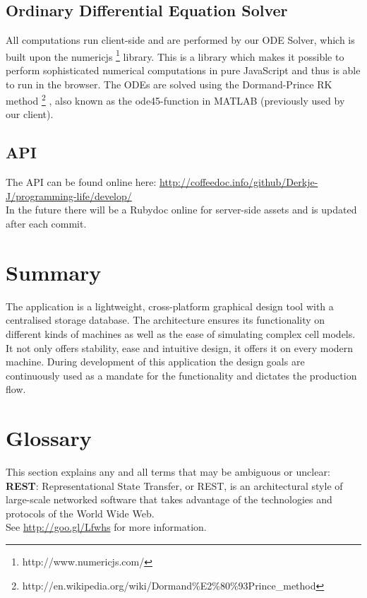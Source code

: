 \documentclass{report}
\begin{document}
		\subsection{Ordinary Differential Equation Solver}
			All computations run client-side and are performed by our ODE Solver, which is built upon the numericjs \footnote{http://www.numericjs.com/} library. This is a library which makes it possible to perform sophisticated numerical computations in pure JavaScript and thus is able to run in the browser. The ODEs are solved using the Dormand-Prince RK method \footnote{http://en.wikipedia.org/wiki/Dormand\%E2\%80\%93Prince\_method} , also known as the ode45-function in MATLAB (previously used by our client).
			
		\subsection{API}
			The API can be found online here: \url{http://coffeedoc.info/github/Derkje-J/programming-life/develop/} \\
			In the future there will be a Rubydoc online for server-side assets and is updated after each commit.
		\newpage
			
	\section{Summary}
		The application is a lightweight, cross-platform graphical design tool with a centralised storage database. The architecture ensures its functionality on different kinds of machines as well as the ease of simulating complex cell models. It not only offers stability, ease and intuitive design, it offers it on every modern machine. During development of this application the design goals are continuously used as a mandate for the functionality and dictates the production flow.
	\section{Glossary}
		This section explains any and all terms that may be ambiguous or unclear:\\
		
		\textbf{REST}: Representational State Transfer, or REST, is an architectural style of large-scale networked software that takes advantage of the technologies and protocols of the World Wide Web. \\
See \href{http://goo.gl/Lfwhs}{http://goo.gl/Lfwhs} for more information.



\listoffootnotes \clearpage
\end{document}
